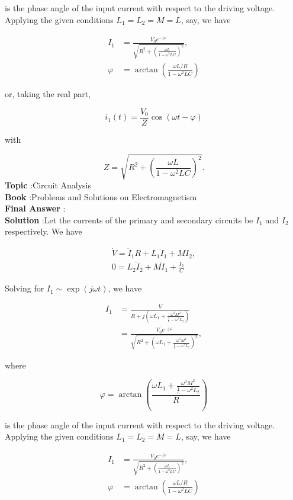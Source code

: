 \documentclass[10pt]{article}
\begin{document}
is the phase angle of the input current with respect to the driving voltage. Applying the given conditions $L_{1}=L_{2}=M=L$, say, we have

$$
\begin{aligned}
I_{1} &=\frac{V_{0} e^{-j \varphi}}{\sqrt{R^{2}+\left(\frac{\omega L}{1-\omega^{2} L C}\right)^{2}}}, \\
\varphi &=\arctan \left(\frac{\omega L / R}{1-\omega^{2} L C}\right)
\end{aligned}
$$

or, taking the real part,

$$
i_{1}(t)=\frac{V_{0}}{Z} \cos (\omega t-\varphi)
$$

with

$$
Z=\sqrt{R^{2}+\left(\frac{\omega L}{1-\omega^{2} L C}\right)^{2}} .
$$
\textbf{Topic} :Circuit Analysis\\
\textbf{Book} :Problems and Solutions on Electromagnetism\\
\textbf{Final Answer} :\\


\textbf{Solution} :Let the currents of the primary and secondary circuits be $I_{1}$ and $I_{2}$ respectively. We have

$$
\begin{gathered}
\dot{V}=\dot{I}_{1} R+L_{1} \ddot{I}_{1}+M \ddot{I}_{2}, \\
0=L_{2} \ddot{I}_{2}+M \ddot{I}_{1}+\frac{I_{2}}{C}
\end{gathered}
$$

Solving for $I_{1} \sim \exp (j \omega t)$, we have

$$
\begin{aligned}
I_{1} &=\frac{V}{R+j\left(\omega L_{1}+\frac{\omega^{3} M^{2}}{\frac{1}{c}-\omega^{2} L_{2}}\right)} \\
&=\frac{V_{0} e^{-j \varphi}}{\sqrt{R^{2}+\left(\omega L_{1}+\frac{\omega^{3} M^{2}}{\frac{1}{c}-\omega^{2} L_{2}}\right)^{2}}},
\end{aligned}
$$

where

$$
\varphi=\arctan \left(\frac{\omega L_{1}+\frac{\omega^{3} M^{2}}{\frac{1}{c}-\omega^{2} L_{2}}}{R}\right)
$$

is the phase angle of the input current with respect to the driving voltage. Applying the given conditions $L_{1}=L_{2}=M=L$, say, we have

$$
\begin{aligned}
I_{1} &=\frac{V_{0} e^{-j \varphi}}{\sqrt{R^{2}+\left(\frac{\omega L}{1-\omega^{2} L C}\right)^{2}}}, \\
\varphi &=\arctan \left(\frac{\omega L / R}{1-\omega^{2} L C}\right)
\end{aligned}
$$
\end{document}
